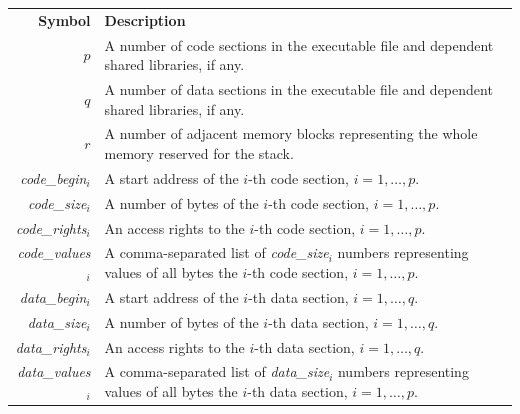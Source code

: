 \documentclass[10pt,twocolumn]{article}
\begin{document}
\clearpage


\begin{table}[!h]
\begin{center}
\def\arraystretch{1}
\begin{tabular}{rp{10cm}}
\textbf{Symbol} & \textbf{Description} \\

$ p $ %
& A number of code sections in the executable file and dependent shared
libraries, if any. %
\\

$ q $ %
& A number of data sections in the executable file and dependent shared
libraries, if any. %
\\

$ r $ %
& A number of adjacent memory blocks representing the whole memory reserved for
the stack. %
\\

\textit{code\_begin}$ _i $ %
& A start address of the $ i $-th code section, $ i = 1,\ldots,p $. %
\\

\textit{code\_size}$ _i $ %
& A number of bytes of the $ i $-th code section, $ i = 1,\ldots,p $. %
\\

\textit{code\_rights}$ _i $ %
& An access rights to the $ i $-th code section, $ i = 1,\ldots,p $. %
\\

\textit{code\_values}$ _i $ %
& A comma-separated list of \textit{code\_size}$ _i $ numbers representing
values of all bytes the $ i $-th code section, $ i = 1,\ldots,p $. %
\\

\textit{data\_begin}$ _i $ %
& A start address of the $ i $-th data section, $ i = 1,\ldots,q $. %
\\

\textit{data\_size}$ _i $ %
& A number of bytes of the $ i $-th data section, $ i = 1,\ldots,q $. %
\\

\textit{data\_rights}$ _i $ %
& An access rights to the $ i $-th data section, $ i = 1,\ldots,q $. %
\\

\textit{data\_values}$ _i $ %
& A comma-separated list of \textit{data\_size}$ _i $ numbers representing
values of all bytes the $ i $-th data section, $ i = 1,\ldots,p $. %
\\


\end{tabular}
\end{center}
\end{table}
\end{document}
